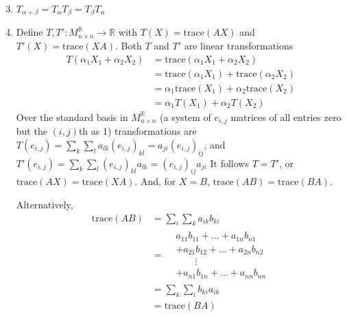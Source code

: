 \documentclass{article}
\newcommand{\trace}{\mathrm{trace}}
\newcommand{\R}{\mathbb{R}}
\begin{document}
\begin{enumerate}[label=\textbf{5.\arabic*.}]
    \setcounter{enumi}{2}
    
    \item $T_{\alpha+\beta} = T_{\alpha}T_{\beta} = T_{\beta}T_{\alpha}$
    
    \addtocounter{enumi}{2}

    \item Define $T, T':M_{n\times n}^{\R} \rightarrow \R$ with
    $T(X) =  \trace(AX)$ and $T'(X) = \trace(XA)$. 
    Both $T$ and $T'$ are linear transformations
    \begin{align*} T(\alpha_1 X_1 + \alpha_2 X_2) &=
    \trace(\alpha_1 X_1 + \alpha_2 X_2) \\
    &= \trace(\alpha_1 X_1) + \trace(\alpha_2 X_2) \\
    &= \alpha_1\trace(X_1) + \alpha_2\trace(X_2) \\
    &= \alpha_1 T(X_1) + \alpha_2 T(X_2)
    \end{align*}
    Over the standard basis in
    $M_{n\times n}^{\R}$ (a system of $e_{i, j}$ matrices of all entries zero
    but the $(i, j)$th as 1) transformations are
    $T(e_{i, j}) = \sum_k\sum_l a_{lk}(e_{i, j})_{kl} = a_{ji}(e_{i, j})_{ij}$,
    and
    $T'(e_{i, j}) = \sum_k\sum_l (e_{i, j})_{kl}a_{lk} = (e_{i, j})_{ij}a_{ji}$
    It follows  $T = T'$, or $\trace(AX) = \trace(XA)$. And, for $X = B$,
    $\trace(AB) = \trace(BA)$.

    Alternatively, \begin{align*} \trace(AB) &= \sum_{i}\sum_{k}a_{ik}b_{ki} \\
    &= \begin{aligned} &a_{11}b_{11} + \ldots + a_{1n}b_{n1} \\
        &+ a_{21}b_{12} + \ldots + a_{2n}b_{n2} \\
        &\qquad \vdots \\
        &+ a_{n1}b_{1n} + \ldots + a_{nn}b_{nn} \end{aligned} \\
    &= \sum_{k}\sum_{i} b_{ki}a_{ik} \\
    &= \trace(BA)
    \end{align*}
\end{enumerate}
\end{document}
